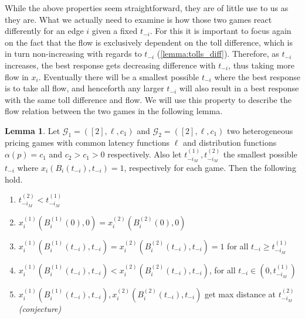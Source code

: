 \documentclass[10pt,a4paper]{book}
\newcommand{\Gm}{\mathcal{G}}
\theoremstyle{definition}
\newtheorem{lemma}[definition]{Lemma}
\theoremstyle{comment}
\begin{document}
While the above properties seem straightforward, they are of little use to us as they are.
What we actually need to examine is how those two games react differently for an edge $i$ given a fixed $t_{-i}$.
For this it is important to focus again on the fact that the flow is exclusively dependent on the toll difference, which is in turn non-increasing with regards to $t_{-i}$ (\ref{lemma:tolls_diff}).
Therefore, as $t_{-i}$ increases, the best response gets decreasing difference with $t_{-i}$, thus taking more flow in $x_i$.
Eventually there will be a smallest possible $t_{-i}$ where the best response is to take all flow, and henceforth any larger $t_{-i}$ will also result in a best response with the same toll difference and flow.
We will use this property to describe the flow relation between the two games in the following lemma.

\begin{lemma}
	\label{lemma:a_fixed_t_iM_fixed}
	Let $\Gm_1 = ([2], \ell, c_1)$ and $\Gm_2 = ([2], \ell, c_1)$ two heterogeneous pricing games with common latency functions $\ell$ and distribution functions $\alpha(p) = c_1$ and $c_2 > c_1 > 0$ respectively.
	Also let $t_{-i_M}^{(1)}, t_{-i_M}^{(2)}$ the smallest possible $t_{-i}$ where $x_i(B_i(t_{-i}), t_{-i}) = 1$, respectively for each game.
	Then the following hold.
	\begin{enumerate}[$(i)$]
		\item $t_{-i_M}^{(2)} < t_{-i_M}^{(1)}$
		\item $x_i^{(1)}(B_i^{(1)}(0), 0) = x_i^{(2)}(B_i^{(2)}(0), 0)$
		\item $x_i^{(1)}(B_i^{(1)}(t_{-i}), t_{-i}) = x_i^{(2)}(B_i^{(2)}(t_{-i}), t_{-i}) = 1$ for all $t_{-i} \ge t_{-i_M}^{(1)}$
		\item $x_i^{(1)}(B_i^{(1)}(t_{-i}), t_{-i}) < x_i^{(2)}(B_i^{(2)}(t_{-i}), t_{-i})$, for all $t_{-i} \in (0, t_{-i_M}^{(1)})$
		\item $x_i^{(1)}(B_i^{(1)}(t_{-i}), t_{-i}), x_i^{(2)}(B_i^{(2)}(t_{-i}), t_{-i})$ get max distance at $t_{-i_M}^{(2)}$ \\
		\textit{(conjecture)}
	\end{enumerate}
\end{lemma}
\end{document}
